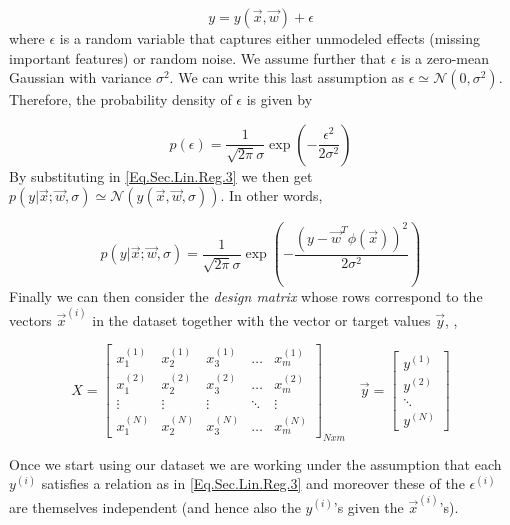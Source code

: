 \begin{equation}\label{Eq.Sec.Lin.Reg.3} 
y = y(\vec{x},\vec{w}) + \epsilon 
\end{equation}
where $\epsilon$ is a random variable that captures either unmodeled effects (\eg missing important features) or random noise. We assume further that $\epsilon$ is a zero-mean Gaussian with variance $\sigma^2$. We can write this last assumption as $\epsilon \simeq \mathcal{N}(0,\sigma^2)$. Therefore, the probability density of $\epsilon$ is given by 

\[ p(\epsilon) = \frac{1}{\sqrt{2\pi}\sigma}\exp\left( - \frac{\epsilon^2}{2\sigma^2}\right)\]
By substituting in \ref{Eq.Sec.Lin.Reg.3} we then get $p(y| \vec{x}; \vec{w}, \sigma) \simeq \mathcal{N}(y(\vec{x},\vec{w}, \sigma))$. In other words,  

\begin{equation}
	p(y| \vec{x}; \vec{w}, \sigma) = \frac{1}{\sqrt{2\pi}\sigma}\exp\left( - \frac{(y-\vec{w}^T\phi(\vec{x}))^2}{2\sigma^2}\right)
\end{equation}
Finally we can then consider the \emph{design matrix} whose rows correspond to the vectors $\vec{x}^{(i)}$ in the dataset together with the vector or target values $\vec{y}$, \ie, 

\[ X = \begin{bmatrix}
	x_{1}^{(1)} & x_{2}^{(1)} & x_{3}^{(1)} & \dots  & x_{m}^{(1)} \\
	x_{1}^{(2)} & x_{2}^{(2)} & x_{3}^{(2)} & \dots  & x_{m}^{(2)} \\
	\vdots & \vdots & \vdots & \ddots & \vdots \\
	x_{1}^{(N)} & x_{2}^{(N)} & x_{3}^{(N)} & \dots  & x_{m}^{(N)}
\end{bmatrix}_{Nxm} \quad \vec{y} = \begin{bmatrix}
y^{(1)} \\
y^{(2)} \\ 
\ddots \\
y^{(N)}
\end{bmatrix}\]


\begin{remark}
	Once we start using our dataset we are working under the assumption that each $y^{(i)}$ satisfies a relation as in \ref{Eq.Sec.Lin.Reg.3} and moreover these of the $\epsilon^{(i)}$ are themselves independent (and hence also the $y^{(i)}$'s given the $\vec{x}^{(i)}$'s).
\end{remark}

